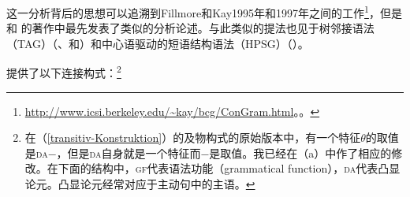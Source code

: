 这一分析背后的思想可以追溯到Fillmore和Kay1995年和1997年之间的工作\footnote{%
\url{http://www.icsi.berkeley.edu/~kay/bcg/ConGram.html}。。
}，但是 和 的著作中最先发表了类似的分析论述。与此类似的提法也见于树邻接语法\indextagc（TAG）（\citealp{Candito96a}、\citealp[]{CK2003a-u}和\citealp[--172]{KO2012a}）和中心语驱动的短语结构语法\indexhpsgc（HPSG）（\citealp{Koenig99a,DK2000b-u,Kordoni2001b-u}）。

 \citet[--57]{MR2001a}提供了以下连接构式：\footnote{%
	在（\ref{transitiv-Konstruktion}）的及物构式的原始版本中，有一个特征$\theta$的取值是\textsc{da}$-$，但是\textsc{da}自身就是一个特征而$-$是取值。我已经在（a）中作了相应的修改。在下面的结构中，\textsc{gf}代表语法功能（grammatical function），\textsc{da}代表凸显论元。凸显论元经常对应于主动句中的主语。}
	
